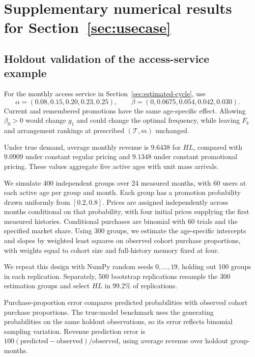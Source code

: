 

\section{Supplementary numerical results for Section~\ref{sec:usecase}}
\label{app:numerical-study}

\begingroup\color{black}
\subsection{Holdout validation of the access-service example}
\label{app:subscription-validation}

\begingroup\color{black}
For the monthly access service in Section~\ref{sec:estimated-cycle}, use
\[
 \alpha=(0.08,0.15,0.20,0.23,0.25),\qquad
 \beta=(0,0.0675,0.054,0.042,0.030).
\]
Current and remembered promotions have the same age-specific effect. Allowing \(\beta_0>0\) would change \(g_1\) and could change the optimal frequency, while leaving \(F_b\) and arrangement rankings at prescribed \((\mathcal T,m)\) unchanged.

\begingroup\color{blue}
Under true demand, average monthly revenue is \(9.6438\) for \(HL\), compared with \(9.0909\) under constant regular pricing and \(9.1348\) under constant promotional pricing. These values aggregate five active ages with unit mass arrivals.
\par\endgroup

We simulate 400 independent groups over 24 measured months, with 60 users at each active age per group and month. Each group has a promotion probability drawn uniformly from \([0.2,0.8]\). Prices are assigned independently across months conditional on that probability, with four initial prices supplying the first measured histories. Conditional purchases are binomial with 60 trials and the specified market share. Using 300 groups, we estimate the age-specific intercepts and slopes by weighted least squares on observed cohort purchase proportions, with weights equal to cohort size and full-history memory fixed at four.

We repeat this design with NumPy random seeds \(0,\ldots,19\), holding out 100 groups in each replication. Separately, 500 bootstrap replications resample the 300 estimation groups and select \(HL\) in \(99.2\%\) of replications.
\par\endgroup
 Purchase-proportion error compares predicted probabilities with observed cohort purchase proportions. The true-model benchmark uses the generating probabilities on the same holdout observations, so its error reflects binomial sampling variation. Revenue prediction error is \(100(\text{predicted}-\text{observed})/\text{observed}\), using average revenue over holdout group-months.

